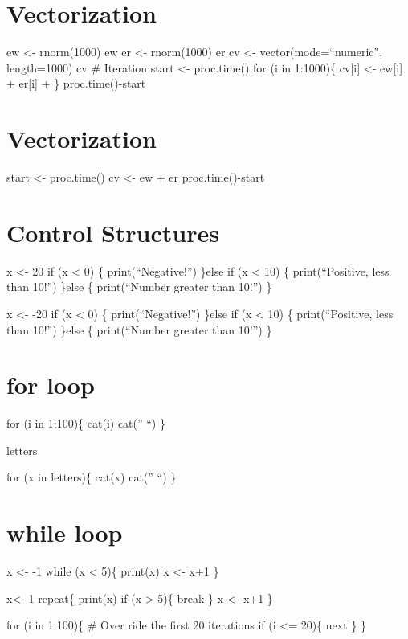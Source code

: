 \documentclass[
]{article}
\begin{document}
\section{Vectorization}\label{vectorization}

ew \textless- rnorm(1000) ew er \textless- rnorm(1000) er cv \textless-
vector(mode=``numeric'', length=1000) cv \# Iteration start \textless-
proc.time() for (i in 1:1000)\{ cv{[}i{]} \textless- ew{[}i{]} +
er{[}i{]} + \} proc.time()-start

\section{Vectorization}\label{vectorization-1}

start \textless- proc.time() cv \textless- ew + er proc.time()-start

\section{Control Structures}\label{control-structures}

x \textless- 20 if (x \textless{} 0) \{ print(``Negative!'') \}else if
(x \textless{} 10) \{ print(``Positive, less than 10!'') \}else \{
print(``Number greater than 10!'') \}

x \textless- -20 if (x \textless{} 0) \{ print(``Negative!'') \}else if
(x \textless{} 10) \{ print(``Positive, less than 10!'') \}else \{
print(``Number greater than 10!'') \}

\section{for loop}\label{for-loop}

for (i in 1:100)\{ cat(i) cat('' ``) \}

letters

for (x in letters)\{ cat(x) cat('' ``) \}

\section{while loop}\label{while-loop}

x \textless- -1 while (x \textless{} 5)\{ print(x) x \textless- x+1 \}

x\textless- 1 repeat\{ print(x) if (x \textgreater{} 5)\{ break \} x
\textless- x+1 \}

for (i in 1:100)\{ \# Over ride the first 20 iterations if (i \textless=
20)\{ next \} \}
\end{document}
